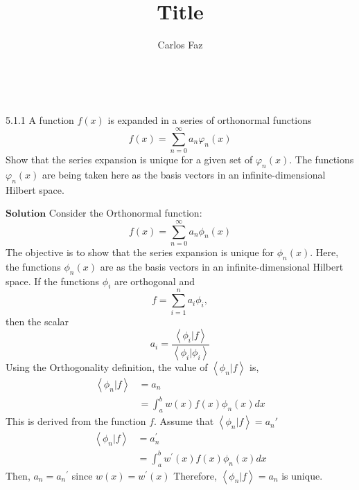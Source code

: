 \documentclass{article}
\title{Title}
\author{Carlos Faz}
\date{ \ }
\begin{document}
\begin{flushleft}



\begin{mybox}{5.1.1}
A function $f(x)$ is expanded in a series of orthonormal functions
$$
f(x)=\sum_{n=0}^{\infty} a_{n} \varphi_{n}(x)
$$
Show that the series expansion is unique for a given set of $\varphi_{n}(x) .$ The functions $\varphi_{n}(x)$ are being taken here as the basis vectors in an infinite-dimensional Hilbert space.
\end{mybox}

$\boxed{\textbf{Solution}}$ Consider the Orthonormal function:
$$
f(x)=\sum_{n=0}^{\infty} a_{n} \phi_{n}(x)
$$
The objective is to show that the series expansion is unique for $\phi_{n}(x)$.
Here, the functions $\phi_{n}(x)$ are as the basis vectors in an infinite-dimensional Hilbert space.
If the functions $\phi_{i}$ are orthogonal and $$f=\sum_{i=1}^{n} a_{i} \phi_{i},$$ then the scalar $$a_{i}=\frac{\left\langle\phi_{i} | f\right\rangle}{\left\langle\phi_{i} | \phi_{i}\right\rangle}$$
Using the Orthogonality definition, the value of $\left\langle\phi_{n} | f\right\rangle$ is,
$$
\begin{aligned}
\left\langle\phi_{n} | f\right\rangle &=a_{n} \\
&=\int_{a}^{b} w(x) f(x) \phi_{n}(x) d x
\end{aligned}
$$
This is derived from the function $f$.
Assume that $\left\langle\phi_{n} | f\right\rangle=a_{n}'$
$$
\begin{aligned}
\left\langle\phi_{n} | f\right\rangle &=a_{n}^{\prime} \\
&=\int_{a}^{b} w^{\prime}(x) f(x) \phi_{n}(x) d x
\end{aligned}
$$
Then, $a_{n}=a_{n}{ }^{\prime}$ since $w(x)=w^{\prime}(x)$ Therefore, $\left\langle\phi_{n} | f\right\rangle=a_{n}$ is unique.


\newpage


\end{flushleft}
\end{document}
